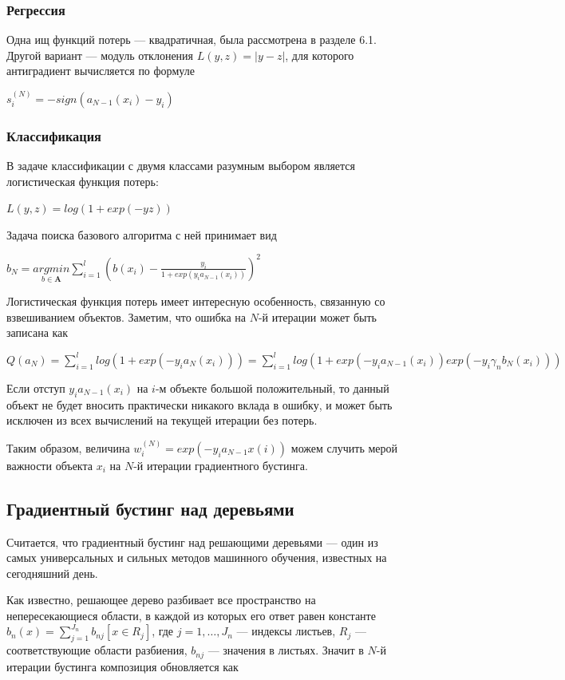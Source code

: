 \documentclass{article}
\theoremstyle{definition}
\theoremstyle{theorem}
\theoremstyle{remark}
\theoremstyle{theorem}
\theoremstyle{example}
\theoremstyle{theorem}
\theoremstyle{theorem}
\theoremstyle{theorem}
\theoremstyle{theorem}
\begin{document}
\subsubsection{Регрессия}

Одна ищ функций потерь --- квадратичная, была рассмотрена в разделе 6.1. Другой вариант --- модуль отклонения $L(y,z) = |y-z|$, для которого антиградиент вычисляется по формуле 

$s_i^{(N)} = -sign(a_{N-1}(x_i)-y_i)$

\subsubsection{Классификация}

В задаче классификации с двумя классами разумным выбором является логистическая функция потерь:

$L(y,z) = log(1+exp(-yz))$

Задача поиска базового алгоритма с ней принимает вид

$b_N = \underset{b\in\mathbf{A}}{argmin}\sum_{i=1}^{l} (b(x_i) - \frac{y_i}{1+exp(y_ia_{N-1}(x_i))})^2$

Логистическая функция потерь имеет интересную особенность, связанную со взвешиванием объектов. Заметим, что ошибка на $N$-й итерации может быть записана как

$Q(a_N) = \sum_{i=1}^{l}log(1+exp(-y_ia_N(x_i))) = \sum_{i=1}^{l}log(1+exp(-y_ia_{N-1}(x_i))exp(-y_i \gamma_n b_N(x_i)))$

Если отступ $y_ia_{N-1}(x_i)$ на $i$-м объекте большой положительный, то данный объект не будет вносить практически никакого вклада в ошибку, и может быть исключен из всех вычислений на текущей итерации без потерь.

Таким образом, величина $w_i^{(N)} = exp(-y_ia_{N-1}x(i))$ можем случить мерой важности объекта $x_i$ на $N$-й итерации градиентного бустинга.


\subsection{Градиентный бустинг над деревьями}

Считается, что градиентный бустинг над решающими деревьями --- один из самых универсальных и сильных методов машинного обучения, известных на сегодняшний день.

Как известно, решающее дерево разбивает все пространство на непересекающиеся области, в каждой из которых его ответ равен константе $b_n(x) = \sum_{j=1}^{J_n} b_{nj}[x\in R_j]$, где $j=1,\ldots,J_n$ --- индексы листьев, $R_{j}$ --- соответствующие области разбиения, $b_{nj}$ --- значения в листьях. Значит в $N$-й итерации бустинга композиция обновляется как
\end{document}
